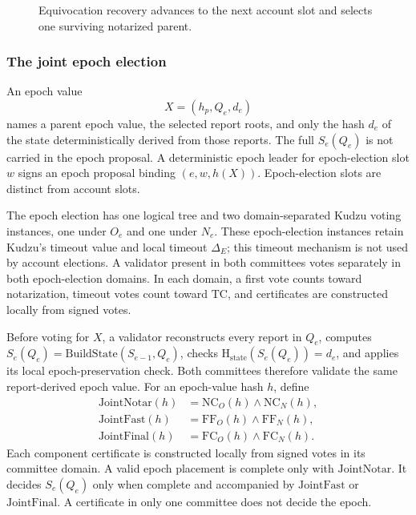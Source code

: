 \documentclass[10pt,twocolumn]{article}
\newcommand{\NC}{\mathrm{NC}}
\newcommand{\FC}{\mathrm{FC}}
\newcommand{\FF}{\mathrm{FF}}
\newcommand{\TC}{\mathrm{TC}}
\newcommand{\StateHash}{\mathrm{H}_{\mathrm{state}}}
\newcommand{\BuildState}{\mathrm{BuildState}}
\begin{document}
\begin{figure}[t]
\centering
\small
{}
\caption{Equivocation recovery advances to the next account slot and selects one surviving notarized parent.}
\end{figure}

\subsubsection{The joint epoch election}
An epoch value
\begin{equation}
X=(h_p,Q_e,d_e)
\end{equation}
names a parent epoch value, the selected report roots, and only the hash $d_e$ of the state deterministically derived from those reports. The full $S_e(Q_e)$ is not carried in the epoch proposal. A deterministic epoch leader for epoch-election slot $w$ signs an epoch proposal binding $(e,w,h(X))$. Epoch-election slots are distinct from account slots.

The epoch election has one logical tree and two domain-separated Kudzu voting instances, one under $O_e$ and one under $N_e$. These epoch-election instances retain Kudzu's timeout value and local timeout $\Delta_E$; this timeout mechanism is not used by account elections. A validator present in both committees votes separately in both epoch-election domains. In each domain, a first vote counts toward notarization, timeout votes count toward $\TC$, and certificates are constructed locally from signed votes.

Before voting for $X$, a validator reconstructs every report in $Q_e$, computes $S_e(Q_e)=\BuildState(S_{e-1},Q_e)$, checks $\StateHash(S_e(Q_e))=d_e$, and applies its local epoch-preservation check. Both committees therefore validate the same report-derived epoch value. For an epoch-value hash $h$, define
\begin{align}
\mathrm{JointNotar}(h)&=\NC_O(h)\wedge\NC_N(h),\\
\mathrm{JointFast}(h)&=\FF_O(h)\wedge\FF_N(h),\\
\mathrm{JointFinal}(h)&=\FC_O(h)\wedge\FC_N(h).
\end{align}
Each component certificate is constructed locally from signed votes in its committee domain. A valid epoch placement is complete only with $\mathrm{JointNotar}$. It decides $S_e(Q_e)$ only when complete and accompanied by $\mathrm{JointFast}$ or $\mathrm{JointFinal}$. A certificate in only one committee does not decide the epoch.
\end{document}
